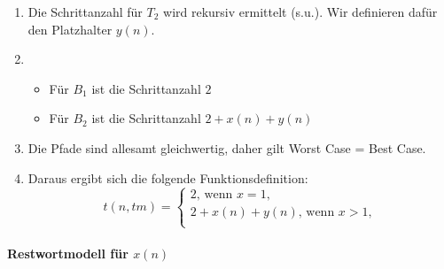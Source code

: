 \begin{enumerate}
        \item Die Schrittanzahl für $T_2$ wird rekursiv ermittelt (s.u.). Wir definieren dafür den Platzhalter $y(n)$. 
        \item 
            \begin{itemize}
                \item Für $B_1$ ist die Schrittanzahl $2$
                \item Für $B_2$ ist die Schrittanzahl $2 + x(n) +  y(n)$
            \end{itemize}
        \item Die Pfade sind allesamt gleichwertig, daher gilt Worst Case = Best Case.
        \item Daraus ergibt sich die folgende Funktionsdefinition:
\[
    t(n, tm) = \begin{cases}
        2\text{, wenn } x = 1,\\
        2 + x(n) + y(n) \text{, wenn } x > 1,\\
    \end{cases}
\]
\end{enumerate}


\paragraph{Restwortmodell für $x(n)$}

